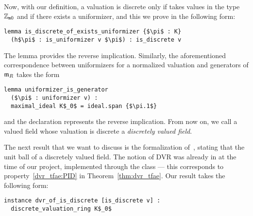 \documentclass[sigplan,10pt,anonymous,review]{acmart}
\begin{document}
Now, with our definition, a valuation is discrete only if takes values in the type $\mathbb{Z}_{\mathtt{m}0}$ and if there exists a uniformizer, and this we prove in the following form\href{https://github.com/LCFT-Lean/local_fields/blob/76ad487d09babdb0018f394a5634526637ee014a/src/discrete_valuation_ring/basic.lean#L160}{\extlink}:
\begin{lstlisting}
lemma is_discrete_of_exists_uniformizer {$\pi$ : K} 
  (h$\pi$ : is_uniformizer v $\pi$) : is_discrete v
\end{lstlisting}
The lemma \href{https://github.com/LCFT-Lean/local_fields/blob/76ad487d09babdb0018f394a5634526637ee014a/src/discrete_valuation_ring/basic.lean#L320}{\extlink} provides the reverse implication. Similarly, the aforementioned correspondence between uniformizers for a normalized valuation and generators of $\mathfrak{m}_{R}$ takes the form\href{https://github.com/LCFT-Lean/local_fields/blob/76ad487d09babdb0018f394a5634526637ee014a/src/discrete_valuation_ring/basic.lean#L291}{\extlink}
\begin{lstlisting}
lemma uniformizer_is_generator 
  ($\pi$ : uniformizer v) :
  maximal_ideal K$_0$ = ideal.span {$\pi.1$}
\end{lstlisting}
and the declaration \href{https://github.com/LCFT-Lean/local_fields/blob/76ad487d09babdb0018f394a5634526637ee014a/src/discrete_valuation_ring/basic.lean#L344}{\extlink} represents the reverse implication. From now on, we call a valued field whose valuation is discrete a \emph{discretely valued field}.

The next result that we want to discuss is the formalization of~\cite[Chapitre~I, \S1, Proposition~1]{Ser62}, stating that the unit ball of a discretely valued field. The notion of DVR was already in \mathlib at the time of our project, implemented through the class \href{https://leanprover-community.github.io/mathlib_docs/ring_theory/discrete_valuation_ring/basic.html#discrete_valuation_ring}{\extlink} --- this corresponds to property~\ref{dvr_tfae:PID} in Theorem~\ref{thm:dvr_tfae}. Our result takes the following form\href{https://github.com/LCFT-Lean/local_fields/blob/76ad487d09babdb0018f394a5634526637ee014a/src/discrete_valuation_ring/basic.lean#L434}{\extlink}:
\begin{lstlisting}[caption={The unit ball is a DVR if the valuation is discrete}, label={code:serre_prop_1}]
instance dvr_of_is_discrete [is_discrete v] :
  discrete_valuation_ring K$_0$
\end{lstlisting}
\end{document}
